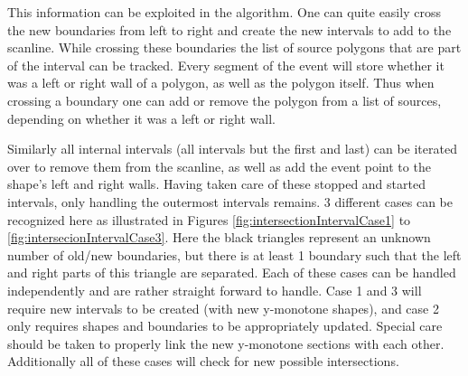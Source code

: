 \documentclass[12pt]{article}
\begin{document}
This information can be exploited in the algorithm. One can quite easily cross the new boundaries from left to right and create the new intervals to add to the scanline. While crossing these boundaries the list of source polygons that are part of the interval can be tracked. Every segment of the event will store whether it was a left or right wall of a polygon, as well as the polygon itself. Thus when crossing a boundary one can add or remove the polygon from a list of sources, depending on whether it was a left or right wall.

Similarly all internal intervals (all intervals but the first and last) can be iterated over to remove them from the scanline, as well as add the event point to the shape's left and right walls.
Having taken care of these stopped and started intervals, only handling the outermost intervals remains. 3 different cases can be recognized here as illustrated in Figures \ref{fig:intersectionIntervalCase1} to \ref{fig:intersecionIntervalCase3}. Here the black triangles represent an unknown number of old/new boundaries, but there is at least 1 boundary such that the left and right parts of this triangle are separated. Each of these cases can be handled independently and are rather straight forward to handle. Case 1 and 3 will require new intervals to be created (with new y-monotone shapes), and case 2 only requires shapes and boundaries to be appropriately updated. Special care should be taken to properly link the new y-monotone sections with each other. Additionally all of these cases will check for new possible intersections. 
\end{document}

